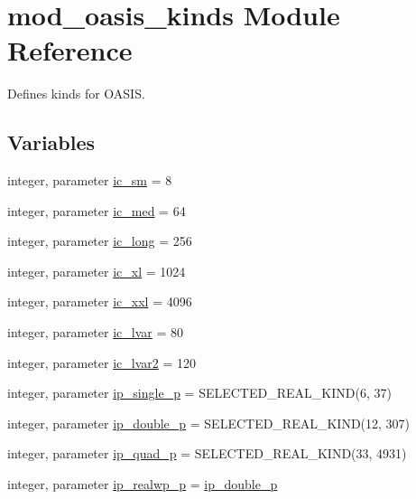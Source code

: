\hypertarget{namespacemod__oasis__kinds}{}\section{mod\+\_\+oasis\+\_\+kinds Module Reference}
\label{namespacemod__oasis__kinds}


Defines kinds for O\+A\+S\+IS.  


\subsection*{Variables}
\begin{DoxyCompactItemize}
\item 
integer, parameter \hyperlink{namespacemod__oasis__kinds_a1a914199db5381b8d08453c7cb468a71}{ic\+\_\+sm} = 8
\item 
integer, parameter \hyperlink{namespacemod__oasis__kinds_a152059eec479887a8347b0f21d30d600}{ic\+\_\+med} = 64
\item 
integer, parameter \hyperlink{namespacemod__oasis__kinds_ada2568a43f71f0f93c054cfd3982da57}{ic\+\_\+long} = 256
\item 
integer, parameter \hyperlink{namespacemod__oasis__kinds_a8da8fcfc62bc8c67614f998f57e7e3fc}{ic\+\_\+xl} = 1024
\item 
integer, parameter \hyperlink{namespacemod__oasis__kinds_a9e7a6d15a336c2bfdadd42213a73f113}{ic\+\_\+xxl} = 4096
\item 
integer, parameter \hyperlink{namespacemod__oasis__kinds_a5c0c2841fb9b4f7cbeb6de3f5731371a}{ic\+\_\+lvar} = 80
\item 
integer, parameter \hyperlink{namespacemod__oasis__kinds_abeab7014394cb77b89575d5d93e5f637}{ic\+\_\+lvar2} = 120
\item 
integer, parameter \hyperlink{namespacemod__oasis__kinds_a298ab0c96a80ba12ba8969e6bcd186ed}{ip\+\_\+single\+\_\+p} = S\+E\+L\+E\+C\+T\+E\+D\+\_\+\+R\+E\+A\+L\+\_\+\+K\+I\+ND(6, 37)
\item 
integer, parameter \hyperlink{namespacemod__oasis__kinds_aff0b6e4604e7a60178eeca47edec1460}{ip\+\_\+double\+\_\+p} = S\+E\+L\+E\+C\+T\+E\+D\+\_\+\+R\+E\+A\+L\+\_\+\+K\+I\+ND(12, 307)
\item 
integer, parameter \hyperlink{namespacemod__oasis__kinds_a7889b0425dd055cdc74af6ba9fa1354c}{ip\+\_\+quad\+\_\+p} = S\+E\+L\+E\+C\+T\+E\+D\+\_\+\+R\+E\+A\+L\+\_\+\+K\+I\+ND(33, 4931)
\item 
integer, parameter \hyperlink{namespacemod__oasis__kinds_a3875d67b4b579bb15696c55b5547d3c4}{ip\+\_\+realwp\+\_\+p} = \hyperlink{namespacemod__oasis__kinds_aff0b6e4604e7a60178eeca47edec1460}{ip\+\_\+double\+\_\+p}

\end{DoxyCompactItemize}
